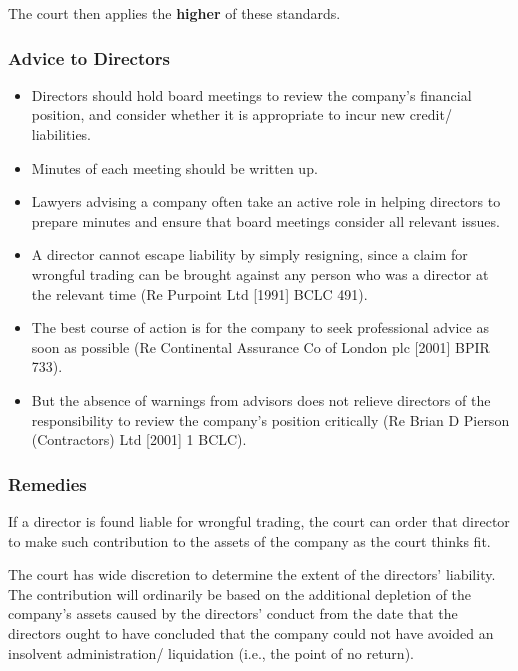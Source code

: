 \documentclass[
]{article}
\providecommand{\tightlist}{%
  \setlength{\itemsep}{0pt}\setlength{\parskip}{0pt}}
\begin{document}
The court then applies the \textbf{higher} of these standards.

\hypertarget{advice-to-directors}{%
\subsubsection{Advice to Directors}\label{advice-to-directors}}

\begin{itemize}
\tightlist
\item
  Directors should hold board meetings to review the company's financial
  position, and consider whether it is appropriate to incur new credit/
  liabilities.
\item
  Minutes of each meeting should be written up.
\item
  Lawyers advising a company often take an active role in helping
  directors to prepare minutes and ensure that board meetings consider
  all relevant issues.
\item
  A director cannot escape liability by simply resigning, since a claim
  for wrongful trading can be brought against any person who was a
  director at the relevant time (Re Purpoint Ltd {[}1991{]} BCLC 491).
\item
  The best course of action is for the company to seek professional
  advice as soon as possible (Re Continental Assurance Co of London plc
  {[}2001{]} BPIR 733).
\item
  But the absence of warnings from advisors does not relieve directors
  of the responsibility to review the company's position critically (Re
  Brian D Pierson (Contractors) Ltd {[}2001{]} 1 BCLC).
\end{itemize}

\hypertarget{remedies-2}{%
\subsubsection{Remedies}\label{remedies-2}}

If a director is found liable for wrongful trading, the court can order
that director to make such contribution to the assets of the company as
the court thinks fit.

The court has wide discretion to determine the extent of the directors'
liability. The contribution will ordinarily be based on the additional
depletion of the company's assets caused by the directors' conduct from
the date that the directors ought to have concluded that the company
could not have avoided an insolvent administration/ liquidation (i.e.,
the point of no return).
\end{document}
